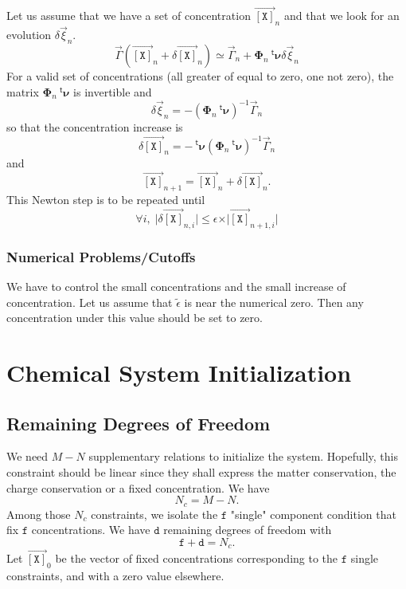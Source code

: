 \documentclass[aps,twocolumn]{revtex4}
\newcommand{\myconc}[1]{\left\lbrack #1 \right\rbrack}
\newcommand{\mychem}[1]{{\mathtt{#1}}}
\newcommand{\mymat}[1]{\boldsymbol{#1}}
\newcommand{\mytrn}[1]{{\!\!~^{\mathsf{t}}{#1}}}
\newcommand{\myvec}[1]{\overrightarrow{#1}}
\newcommand{\vecX}{\myvec{\myconc{\mychem{X}}}}
\newcommand{\dof}{\mathtt{d}}
\newcommand{\fixed}{\mathtt{f}}
\begin{document}
Let us assume that we have a set of concentration $\vecX_{n}$ and that we look for an evolution $\delta\vec{\xi}_{n}$.
\begin{equation}
	\vec{\Gamma}\left(\vecX_{n}+\delta\vecX_{n}\right) \simeq \vec{\Gamma}_{n} + \mymat{\Phi}_n \mytrn{\mymat{\nu}} \delta\vec{\xi}_n
\end{equation}
For a valid set of concentrations (all greater of equal to zero, one not zero), the matrix $\mymat{\Phi}_n \mytrn{\mymat{\nu}}$ is invertible
and
\begin{equation}
	\delta\vec{\xi}_n = -\left(\mymat{\Phi}_n \mytrn{\mymat{\nu}}\right)^{-1} \vec{\Gamma}_{n}
\end{equation}
so that the concentration increase is
\begin{equation}
	\delta\vecX_{n} = - \mytrn{\mymat{\nu}}\left(\mymat{\Phi}_n \mytrn{\mymat{\nu}}\right)^{-1} \vec{\Gamma}_{n}
\end{equation}
and
\begin{equation}
	\vecX_{n+1} = \vecX_{n} + \delta\vecX_{n}.
\end{equation}
This Newton step is to be repeated until
\begin{equation}
	\forall i, \; \vert\delta\vecX_{n,i}\vert \leq \epsilon \times \vert\vecX_{n+1,i}\vert
\end{equation}

\subsubsection{Numerical Problems/Cutoffs}
We have to control the small concentrations and the small increase of concentration.
Let us assume that $\tilde\epsilon$ is near the numerical zero. Then any concentration under this value
should be set to zero. 


\section{Chemical System Initialization}
\subsection{Remaining Degrees of Freedom}
We need $M-N$ supplementary relations to initialize the system. Hopefully, this constraint should be linear
since they shall express the matter conservation, the charge conservation or a fixed concentration.
We have
$$
	N_c  = M-N.
$$
Among those $N_c$ constraints, we isolate the $\fixed$ "single" component condition that fix $\fixed$ concentrations.
We have $\dof$ remaining degrees of freedom with
$$
	\fixed + \dof = N_c.
$$
Let $\vecX_0$ be the vector of fixed concentrations corresponding to the $\fixed$ single constraints, and with
a zero value elsewhere.
\end{document}
